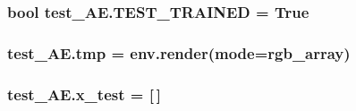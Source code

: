 \subsubsection[{\texorpdfstring{T\+E\+S\+T\+\_\+\+T\+R\+A\+I\+N\+ED}{TEST_TRAINED}}]{\setlength{\rightskip}{0pt plus 5cm}bool test\+\_\+\+A\+E.\+T\+E\+S\+T\+\_\+\+T\+R\+A\+I\+N\+ED = True}\hypertarget{namespacetest___a_e_aa18af3dffd177ea468b742287b5328c3}{}\label{namespacetest___a_e_aa18af3dffd177ea468b742287b5328c3}
\subsubsection[{\texorpdfstring{tmp}{tmp}}]{\setlength{\rightskip}{0pt plus 5cm}test\+\_\+\+A\+E.\+tmp = env.\+render(mode=\textquotesingle{}rgb\+\_\+array\textquotesingle{})}\hypertarget{namespacetest___a_e_aee89269a4b168745cf2442a4b9f95894}{}\label{namespacetest___a_e_aee89269a4b168745cf2442a4b9f95894}
\subsubsection[{\texorpdfstring{x\+\_\+test}{x_test}}]{\setlength{\rightskip}{0pt plus 5cm}test\+\_\+\+A\+E.\+x\+\_\+test = \mbox{[}$\,$\mbox{]}}\hypertarget{namespacetest___a_e_ae76668377d6fc202f73ebccc13d89857}{}\label{namespacetest___a_e_ae76668377d6fc202f73ebccc13d89857}
